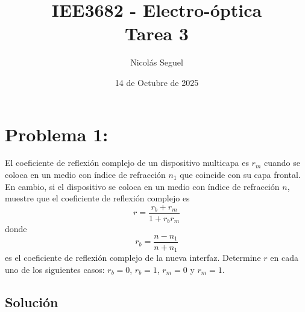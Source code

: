 \documentclass[11pt]{article}
\title{IEE3682 - Electro-óptica \\
Tarea 3}
\author{Nicolás Seguel}
\date{14 de Octubre de 2025}
\begin{document}
\maketitle

\section*{Problema 1:}

El coeficiente de reflexión complejo de un dispositivo multicapa es \(r_m\) cuando se coloca en un medio con índice de refracción \(n_1\) que coincide con su capa frontal. En cambio, si el dispositivo se coloca en un medio con índice de refracción \(n\), muestre que el coeficiente de reflexión complejo es
\[
r = \frac{r_b + r_m}{1 + r_b r_m}
\]
donde
\[
r_b = \frac{n - n_1}{n + n_1}
\]
es el coeficiente de reflexión complejo de la nueva interfaz. Determine \(r\) en cada uno de los siguientes casos: \(r_b = 0\), \(r_b = 1\), \(r_m = 0\) y \(r_m = 1\).
\vspace{0.5em}

\subsection*{Solución}
\end{document}

